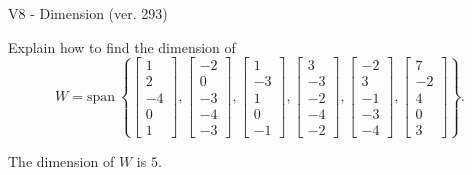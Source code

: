 \begin{exercise}
  \begin{exerciseTitle}V8 - Dimension (ver. 293)\end{exerciseTitle}
  \begin{exerciseStatement}
    Explain how to find the dimension of 
\[W=\mathrm{span}\ \left\{\left[\begin{array}{r}
1 \\
2 \\
-4 \\
0 \\
1
\end{array}\right] , \left[\begin{array}{r}
-2 \\
0 \\
-3 \\
-4 \\
-3
\end{array}\right] , \left[\begin{array}{r}
1 \\
-3 \\
1 \\
0 \\
-1
\end{array}\right] , \left[\begin{array}{r}
3 \\
-3 \\
-2 \\
-4 \\
-2
\end{array}\right] , \left[\begin{array}{r}
-2 \\
3 \\
-1 \\
-3 \\
-4
\end{array}\right] , \left[\begin{array}{r}
7 \\
-2 \\
4 \\
0 \\
3
\end{array}\right]\right\}.\]



  \end{exerciseStatement}
  \begin{exerciseAnswer}
   The dimension of \(W\) is  \(5\).
  


  \end{exerciseAnswer}
\end{exercise}